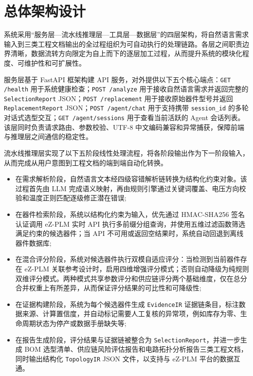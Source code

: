 
\section{总体架构设计}
\label{sec:architectrue}
系统采用“服务层—流水线推理层—工具层—数据层”的四层架构，将自然语言需求输入到三类工程文档输出的全过程组织为可自动执行的处理链路。各层之间职责边界清晰，数据流转方向限定为自上而下的逐层加工过程，从而提升系统的模块化程度、可维护性和可扩展性。

服务层基于 FastAPI 框架构建 API 服务，对外提供以下五个核心端点：\texttt{GET /health} 用于系统健康检查；\texttt{POST /analyze} 用于接收自然语言需求并返回完整的 \texttt{SelectionReport} JSON；\texttt{POST /replacement} 用于接收原始器件型号并返回 \texttt{ReplacementReport} JSON；\texttt{POST /agent/chat} 用于支持携带 \texttt{session\_id} 的多轮对话式选型交互；\texttt{GET /agent/sessions} 用于查看当前活跃的 Agent 会话列表。该层同时负责请求路由、参数校验、UTF-8 中文编码兼容和异常捕获，保障前端与推理层之间通信的稳定性。

流水线推理层实现了以下五阶段线性处理流程，将各阶段输出作为下一阶段输入，从而完成从用户意图到工程文档的端到端自动化转换。
\begin{itemize}
    \item 在需求解析阶段，自然语言文本经四级容错解析链转换为结构化约束对象。该过程首先由 LLM 完成语义映射，再由规则引擎通过关键词覆盖、电压方向校验和温度正则匹配逐级修正潜在错误;
    \item 在器件检索阶段，系统以结构化约束为输入，优先通过 HMAC-SHA256 签名认证调用 eZ-PLM 实时 API 执行多前缀分组查询，并使用五维过滤函数筛选满足约束的候选器件；当 API 不可用或返回空结果时，系统自动回退到离线器件数据库;
    \item 在混合评分阶段，系统对候选器件执行双模自适应评分：当检测到当前器件存在 eZ-PLM 关联参考设计时，启用四维增强评分模式；否则自动降级为纯规则双维评分模式。两种模式共享参数评分和供应链评分两个基础维度，仅在总分合并权重上有所差异，从而保证评分结果的可比性和可降级性;
    \item 在证据构建阶段，系统为每个候选器件生成 \texttt{EvidenceIR} 证据链条目，标注数据来源、计算置信度，并自动标记需要人工复核的异常项，例如库存为零、生命周期状态为停产或数据手册缺失等;
    \item 在报告生成阶段，评分结果与证据链被整合为 \texttt{SelectionReport}，并进一步生成 BOM 选型清单、供应链风险评估报告和电路拓扑分析报告三类工程文档，同时输出结构化 \texttt{TopologyIR} JSON 文件，以支持与 eZ-PLM 平台的数据互通。
\end{itemize}

